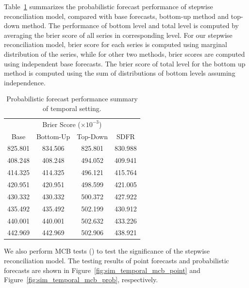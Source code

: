 \documentclass[a4paper,review,12pt,authoryear]{elsarticle}
\begin{document}
Table~\ref{tab:sim_temporal_res_dist} summarizes the probabilistic forecast performance of stepwise reconciliation model, compared with base forecasts, bottom-up method and top-down method.
The performance of bottom level and total level is computed by averaging the brier score of all series in corresponding level. For our stepwise reconciliation model, brier score for each series is computed using marginal distribution of the series, while for other two methods, brier scores are computed using independent base forecasts. 
The brier score of total level for the bottom up method is computed using the sum of distributions of bottom levels assuming independence.
\begin{table}[h]
\centering
\caption{\label{tab:sim_temporal_res_dist} Probabilistic forecast performance summary of temporal setting.}
\begin{tabular}{cccc}
\toprule
\multicolumn{4}{c}{Brier Score ($\times 10^{-3}$)}\\ 
Base & Bottom-Up & Top-Down & SDFR \\\midrule
825.801 & 834.506 & 825.801& 830.988\\
408.248 & 408.248 & 494.052 & 409.941 \\
414.325 & 414.325 & 496.121 & 415.764\\
420.951 & 420.951 & 498.599 & 421.005\\
430.332& 430.332& 500.372 & 427.922\\
435.492 & 435.492 & 502.199 & 430.912 \\
440.001& 440.001& 502.632 & 433.226 \\
442.969 & 442.969 & 502.906& 438.921 \\
\bottomrule
\end{tabular}
\end{table}

We also perform MCB tests () to test the significance of the stepwise reconciliation model. 
The testing results of point forecasts and probabilistic forecasts are shown in Figure~\ref{fig:sim_temporal_mcb_point} and Figure~\ref{fig:sim_temporal_mcb_prob}, respectively.
\end{document}
